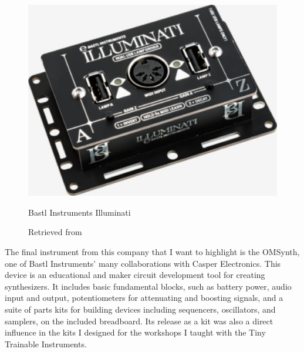 \begin{figure}[ht]
  \centering
  \includegraphics[width=0.75\linewidth,height=0.25\textheight,keepaspectratio]{images/bastl-illuminati.jpg}
  \caption{Bastl Instruments Illuminati}
  \caption*{Retrieved from \cite{website-bastl-instruments-current}}
  \label{fig:bastl-illuminati}
\end{figure}

The final instrument from this company that I want to highlight is the OMSynth, one of Bastl Instruments' many collaborations with Casper Electronics. This device is an educational and maker circuit development tool for creating synthesizers. It includes basic fundamental blocks, such as battery power, audio input and output, potentiometers for attenuating and boosting signals, and a suite of parts kits for building devices including sequencers, oscillators, and samplers, on the included breadboard. Its release as a kit was also a direct influence in the kits I designed for the workshops I taught with the Tiny Trainable Instruments.

